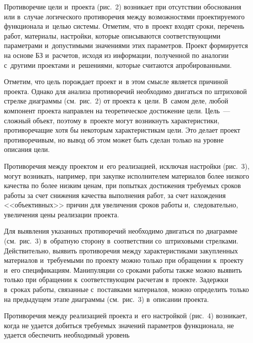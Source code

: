 \begin{multicols}{2}
 
  Противоречие цели и~проекта (рис.~2) возникает при отсутствии обоснования 
или в~случае логического противоречия между возможностями проектируемого 
функционала и~целью системы. Отметим, что в~проект входят сроки, перечень 
работ, материалы, настройки, которые описываются соответствующими 
параметрами и~допустимыми значениями этих параметров. Проект формируется 
на основе БЗ и~расчетов, исходя из информации, полученной по аналогии 
с~другими проектами и~решениями, которые считаются апробированными. 
  
  Отметим, что цель порождает проект и~в этом смысле является причиной 
проекта. Однако для анализа противоречий необходимо двигаться по штриховой 
стрелке диаграммы (см.\ рис.~2) от проекта к~цели. В~самом деле, любой компонент 
проекта направлен на теоретическое достижение цели. Цель~--- сложный объект, 
поэтому в~проекте могут возникнуть характеристики, противоречащие хотя бы 
некоторым характеристикам цели. Это делает проект противоречивым, но вывод 
об этом может быть сделан только на уровне описания цели. 
  

  Противоречия между проектом и~его реализацией, исключая настройки 
(рис.~3), могут возникать, например, при закупке исполнителем материалов более 
низкого качества по более низким ценам, при попытках достижения требуемых 
сроков работы за счет снижения качества выполнения работ, за счет нахождения 
<<объективных>> причин для увеличения сроков работы и,~следовательно, 
увеличения цены реализации проекта. 


  Для выявления указанных противоречий необходимо двигаться по диаграмме 
(см.\ рис.~3) в~обратную сторону в~соответствии со~штриховыми стрелками. 
Действительно, выявить противоречия между характеристиками закупленных 
материалов и~требуемыми по проекту можно только при обращении к~проекту 
и~его спецификациям. Манипуляции со сроками работы также можно выявить 
только при обращении к~соответствующим расчетам в~проекте. Задержки в~сроках 
работы, связанные с~поставками материалов, можно определить только на 
предыдущем этапе диаграммы (см.\ рис.~3) в~описании проекта. 


  


  Противоречия между реализацией проекта и~его настройкой (рис.~4) возникает, 
когда не удается добиться требуемых значений параметров функционала, не 
удается обеспечить необходимый уровень\linebreak\vspace*{-12pt}


\end{multicols}
